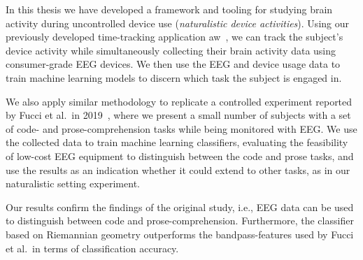 



In this thesis we have developed a framework and tooling for studying brain activity during uncontrolled device use (\emph{naturalistic device activities}). Using our previously developed time-tracking application \gls{aw}~\cite{bjareholt_activitywatch_2020}, we can track the subject's device activity while simultaneously collecting their brain activity data using consumer-grade EEG devices. We then use the EEG and device usage data to train machine learning models to discern which task the subject is engaged in.

We also apply similar methodology to replicate a controlled experiment reported by Fucci et al.~in 2019~\cite{fucci_replication_2019}, where we present a small number of subjects with a set of code- and prose-comprehension tasks while being monitored with EEG\@. We use the collected data to train machine learning classifiers, evaluating the feasibility of low-cost EEG equipment to distinguish between the code and prose tasks, and use the results as an indication whether it could extend to other tasks, as in our naturalistic setting experiment.


Our results confirm the findings of the original study, i.e., EEG data can be used to distinguish between code and prose-comprehension. Furthermore, the classifier based on Riemannian geometry outperforms the bandpass-features used by Fucci et al.~in terms of classification accuracy.

